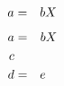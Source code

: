 \documentclass{article}
\begin{document}
\begin{eqnarray}a&=&b&X\cr\end{eqnarray}
\begin{eqnarray}a&=&b&X\cr c\\ d&=&e\end{eqnarray}
\end{document}
